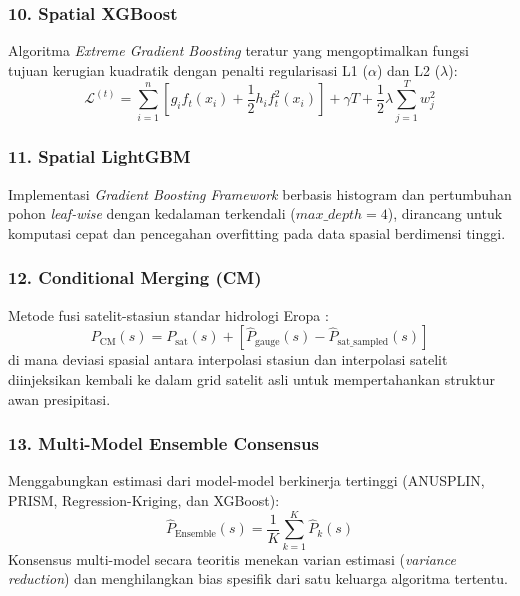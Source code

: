 \documentclass[11pt,a4paper]{article}
\begin{document}
\subsubsection{10. Spatial XGBoost}
Algoritma \textit{Extreme Gradient Boosting} teratur yang mengoptimalkan fungsi tujuan kerugian kuadratik dengan penalti regularisasi L1 ($\alpha$) dan L2 ($\lambda$):
\begin{equation}
    \mathcal{L}^{(t)} = \sum_{i=1}^n \left[ g_i f_t(x_i) + \frac{1}{2} h_i f_t^2(x_i) \right] + \gamma T + \frac{1}{2} \lambda \sum_{j=1}^T w_j^2
\end{equation}

\subsubsection{11. Spatial LightGBM}
Implementasi \textit{Gradient Boosting Framework} berbasis histogram dan pertumbuhan pohon \textit{leaf-wise} dengan kedalaman terkendali ($max\_depth = 4$), dirancang untuk komputasi cepat dan pencegahan overfitting pada data spasial berdimensi tinggi.

\subsubsection{12. Conditional Merging (CM)}
Metode fusi satelit-stasiun standar hidrologi Eropa \cite{sinclair2005conditional}:
\begin{equation}
    P_{\text{CM}}(s) = P_{\text{sat}}(s) + \left[ \hat{P}_{\text{gauge}}(s) - \hat{P}_{\text{sat\_sampled}}(s) \right]
\end{equation}
di mana deviasi spasial antara interpolasi stasiun dan interpolasi satelit diinjeksikan kembali ke dalam grid satelit asli untuk mempertahankan struktur awan presipitasi.

\subsubsection{13. Multi-Model Ensemble Consensus}
Menggabungkan estimasi dari model-model berkinerja tertinggi (ANUSPLIN, PRISM, Regression-Kriging, dan XGBoost):
\begin{equation}
    \hat{P}_{\text{Ensemble}}(s) = \frac{1}{K} \sum_{k=1}^K \hat{P}_k(s)
\end{equation}
Konsensus multi-model secara teoritis menekan varian estimasi (\textit{variance reduction}) dan menghilangkan bias spesifik dari satu keluarga algoritma tertentu.
\end{document}
